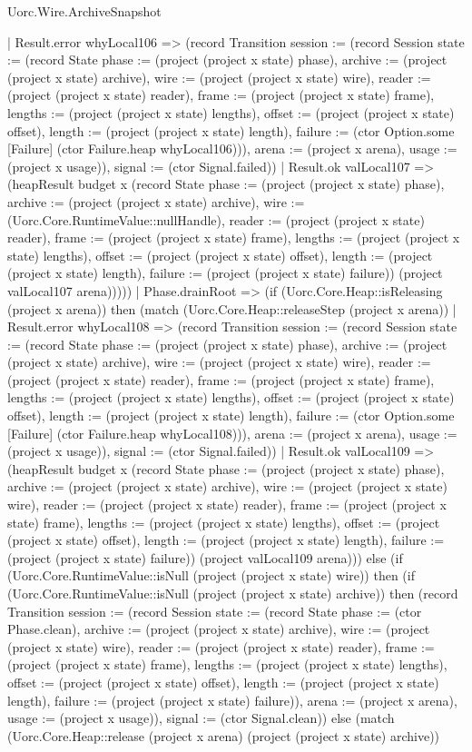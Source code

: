 \begin{lexlean}{Uorc.Wire.ArchiveSnapshot}
\begin{semanticmodule}
{      | Result.error whyLocal106 => (record Transition {session := (record Session {state := (record State {phase := (project (project x state) phase), archive := (project (project x state) archive), wire := (project (project x state) wire), reader := (project (project x state) reader), frame := (project (project x state) frame), lengths := (project (project x state) lengths), offset := (project (project x state) offset), length := (project (project x state) length), failure := (ctor Option.some [Failure] (ctor Failure.heap whyLocal106))}), arena := (project x arena), usage := (project x usage)}), signal := (ctor Signal.failed)})
      | Result.ok valLocal107 => (heapResult budget x (record State {phase := (project (project x state) phase), archive := (project (project x state) archive), wire := (Uorc.Core.RuntimeValue::nullHandle), reader := (project (project x state) reader), frame := (project (project x state) frame), lengths := (project (project x state) lengths), offset := (project (project x state) offset), length := (project (project x state) length), failure := (project (project x state) failure)}) (project valLocal107 arena)))))
    | Phase.drainRoot => (if (Uorc.Core.Heap::isReleasing (project x arena)) then (match (Uorc.Core.Heap::releaseStep (project x arena))
      | Result.error whyLocal108 => (record Transition {session := (record Session {state := (record State {phase := (project (project x state) phase), archive := (project (project x state) archive), wire := (project (project x state) wire), reader := (project (project x state) reader), frame := (project (project x state) frame), lengths := (project (project x state) lengths), offset := (project (project x state) offset), length := (project (project x state) length), failure := (ctor Option.some [Failure] (ctor Failure.heap whyLocal108))}), arena := (project x arena), usage := (project x usage)}), signal := (ctor Signal.failed)})
      | Result.ok valLocal109 => (heapResult budget x (record State {phase := (project (project x state) phase), archive := (project (project x state) archive), wire := (project (project x state) wire), reader := (project (project x state) reader), frame := (project (project x state) frame), lengths := (project (project x state) lengths), offset := (project (project x state) offset), length := (project (project x state) length), failure := (project (project x state) failure)}) (project valLocal109 arena))) else (if (Uorc.Core.RuntimeValue::isNull (project (project x state) wire)) then (if (Uorc.Core.RuntimeValue::isNull (project (project x state) archive)) then (record Transition {session := (record Session {state := (record State {phase := (ctor Phase.clean), archive := (project (project x state) archive), wire := (project (project x state) wire), reader := (project (project x state) reader), frame := (project (project x state) frame), lengths := (project (project x state) lengths), offset := (project (project x state) offset), length := (project (project x state) length), failure := (project (project x state) failure)}), arena := (project x arena), usage := (project x usage)}), signal := (ctor Signal.clean)}) else (match (Uorc.Core.Heap::release (project x arena) (project (project x state) archive))
}
\end{semanticmodule}
\end{lexlean}
